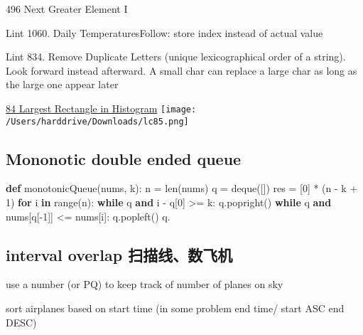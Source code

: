 \documentclass[
]{article}
\newenvironment{Shaded}{}{}
\newcommand{\BuiltInTok}[1]{#1}
\newcommand{\ControlFlowTok}[1]{\textcolor[rgb]{0.00,0.44,0.13}{\textbf{#1}}}
\newcommand{\DecValTok}[1]{\textcolor[rgb]{0.25,0.63,0.44}{#1}}
\newcommand{\KeywordTok}[1]{\textcolor[rgb]{0.00,0.44,0.13}{\textbf{#1}}}
\newcommand{\NormalTok}[1]{#1}
\newcommand{\OperatorTok}[1]{\textcolor[rgb]{0.40,0.40,0.40}{#1}}
\begin{document}
496 Next Greater Element I

Lint 1060. Daily TemperaturesFollow: store index instead of actual value

Lint 834. Remove Duplicate Letters (unique lexicographical order of a
string). Look forward instead afterward. A small char can replace a
large char as long as the large one appear later

\href{https://leetcode.com/problems/largest-rectangle-in-histogram/}{84
Largest Rectangle in Histogram}
\texttt{[image: /Users/harddrive/Downloads/lc85.png]}

\hypertarget{mononotic-double-ended-queue}{%
\subsection{Mononotic double ended
queue}\label{mononotic-double-ended-queue}}

\begin{Shaded}
\begin{Highlighting}[]
\KeywordTok{def}\NormalTok{ monotonicQueue(nums, k):}
\NormalTok{  n }\OperatorTok{=} \BuiltInTok{len}\NormalTok{(nums)}
\NormalTok{  q }\OperatorTok{=}\NormalTok{ deque([])}
\NormalTok{  res }\OperatorTok{=}\NormalTok{ [}\DecValTok{0}\NormalTok{] }\OperatorTok{*}\NormalTok{ (n }\OperatorTok{{-}}\NormalTok{ k }\OperatorTok{+} \DecValTok{1}\NormalTok{)}
  \ControlFlowTok{for}\NormalTok{ i }\KeywordTok{in} \BuiltInTok{range}\NormalTok{(n):}
    \ControlFlowTok{while}\NormalTok{ q }\KeywordTok{and}\NormalTok{ i }\OperatorTok{{-}}\NormalTok{ q[}\DecValTok{0}\NormalTok{] }\OperatorTok{\textgreater{}=}\NormalTok{ k: q.popright()}
    \ControlFlowTok{while}\NormalTok{ q }\KeywordTok{and}\NormalTok{ nums[q[}\OperatorTok{{-}}\DecValTok{1}\NormalTok{]] }\OperatorTok{\textless{}=}\NormalTok{ nums[i]: q.popleft()}
\NormalTok{    q.}
\end{Highlighting}
\end{Shaded}

\hypertarget{interval-overlap-ux626bux63cfux7ebfux6570ux98deux673a}{%
\subsection{interval overlap
扫描线、数飞机}\label{interval-overlap-ux626bux63cfux7ebfux6570ux98deux673a}}

use a number (or PQ) to keep track of number of planes on sky

sort airplanes based on start time (in some problem end time/ start ASC
end DESC)
\end{document}
